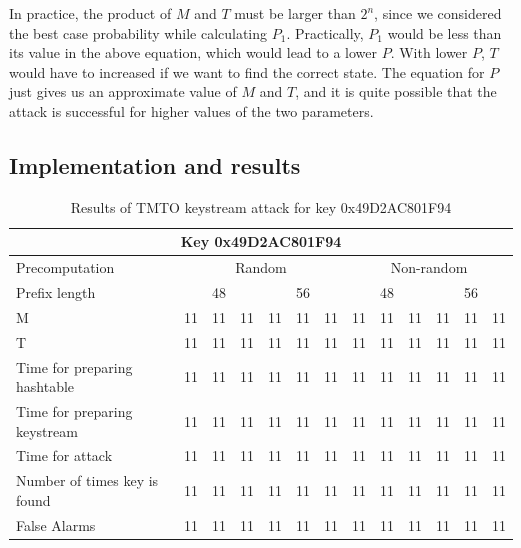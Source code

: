 In practice, the product of $M$ and $T$ must be larger than $2^n$, since we considered the best case probability while calculating $P_1$. Practically, $P_1$ would be less than its value in the above equation, which would lead to a lower $P$. With lower $P$, $T$ would have to increased if we want to find the correct state. The equation for $P$ just gives us an approximate value of $M$ and $T$, and it is quite possible that the attack is successful for higher values of the two parameters.


\subsection{Implementation and results}


\begin{table}[ht!]
\begin{center}
\begin{tabular}{|p{3cm}||c|c|c|l|l|l|l|l|l|l|l|l|}
\hline
\multicolumn{13}{|c|}{\textbf{Key 0x49D2AC801F94}} \\ \hline
Precomputation & \multicolumn{6}{|c|}{Random} & \multicolumn{6}{|c|}{Non-random} \\ \hline
Prefix length& \multicolumn{3}{|c|}{48} & \multicolumn{3}{|c|}{56} & \multicolumn{3}{|c|}{48} & \multicolumn{3}{|c|}{56} \\ \hline \hline

M		&	11 &	11 &	11 &	11 &	11 &	11 &	11 & 11 &	11 &	11 &	11 &	11 \\ \hline
T	  &	11 &	11 &	11 &	11 &	11 &	11 &	11 & 11 &	11 &	11 &	11 &	11 \\ \hline
Time for preparing hashtable		&	11 &	11 &	11 &	11 &	11 &	11 &	11 & 11 &	11 &	11 &	11 &	11 \\ \hline
Time for preparing keystream		&	11 &	11 &	11 &	11 &	11 &	11 &	11 & 11 &	11 &	11 &	11 &	11 \\ \hline
Time for attack								&	11 &	11 &	11 &	11 &	11 &	11 &	11 & 11 &	11 &	11 &	11 &	11 \\ \hline
Number of times key is found	&	11 &	11 &	11 &	11 &	11 &	11 &	11 & 11 &	11 &	11 &	11 &	11 \\ \hline
False Alarms									&	11 &	11 &	11 &	11 &	11 &	11 &	11 & 11 &	11 &	11 &	11 &	11 \\ \hline
\end{tabular}
\end{center}
\caption{Results of TMTO keystream attack for key 0x49D2AC801F94}
\label{tab:keystream-attack-results}
\end{table}
